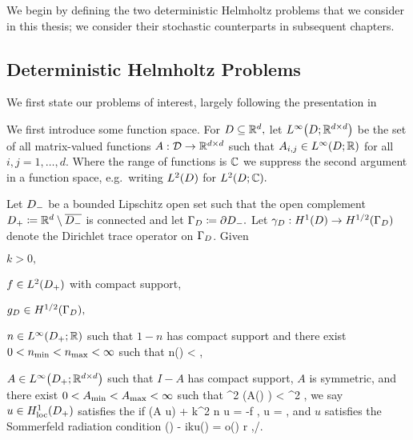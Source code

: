   We  begin by defining the two deterministic Helmholtz problems that we consider in this thesis; we  consider their stochastic counterparts in subsequent chapters.

\subsection{Deterministic Helmholtz Problems}\label{sec:detprobs}

We first state our problems of interest, largely following the presentation in \cite{GrPeSp:19}

We first introduce some function space. For $D \subseteq \mathbb R^{d},$ let $\LiDRRdtd$ be the set of all matrix-valued functions $A:\mathcal D\rightarrow\mathbb R^{d\times d}$ such that $A_{i,j} \in \LiDRR$ for all $i,j =   1,\ldots,d.$ Where the range of functions is $\mathbb C$ we suppress the second argument in a function space, e.g.~writing $\LtD$ for $\LtDCC.$

  \label{prob:edp}
  Let $D_{-}$ be a bounded Lipschitz open set such that the open complement $D_{+} \coloneqq \mathbb R^{d} \setminus \overline{D_{-}}$ is connected and let $\Gamma_{D} \coloneqq \partial D_{-}.$ Let $\trD:\HoD\rightarrow\HhGD$ denote the Dirichlet trace operator on $\Gamma_{D}$. Given
  \bit
  \item $k > 0,$
\item $f \in \LtDp$ with compact support,
\item $\gD \in \HhGD,$
\item $n \in \LiDpRR$ such that $1-n$ has compact support and there exist $0 < n_{\min} < n_{\max} < \infty$ such that
  \beq\label{eq:nbounds}
\nmin \leq n(\bx) < \nmax \tfae \bx \in \Dp,
  \eeq
\item $A \in \LiDpRRdtd$ such that $I-A$ has compact support, $A$ is symmetric, and there exist $0 < A_{\min} < A_{\max} < \infty$ such that
  \beq\label{eq:Abounds}
\Amin \abs{\bxi}^2 \leq \mleft(A(\bx) \bxi \mright) \cdot \bxibar < \Amax \abs{\bxi}^2 \tfa \bxi \in \CCd \tfae \bx \in \Dp,
  \eeq
  \eit
  we say $u \in \HolocDp$ satisfies the  if
  \beq\label{eq:hhedp}
\grad \cdot \mleft(A \grad u\mright) + k^2 n u = -f \tin \Dp,
\eeq
\beq\label{eq:dbc}
\trGD u = \gD,
\eeq
and $u$ satisfies the Sommerfeld radiation condition
\beq\label{eq:sommerfeld}
\dudr(\bx) - iku(\bx) = o\mleft(\mright) r \de \abs{\bx} \rightarrow \infty,\bxhat \de \bx/\abs{\bx}.
\eeq
\eprob

